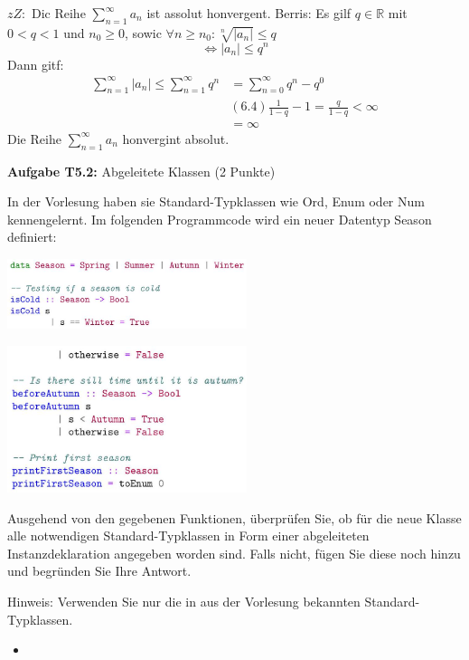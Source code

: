 $z Z:$ Dic Reihe $\sum_{n=1}^{\infty} a_n$ ist assolut honvergent.
Berris:
Es gilf $q \in \mathbb{R}$ mit $0<q<1$ und $n_0 \geq 0$, sowic $\forall n \geq n_0: \sqrt[n]{\left|a_n\right|} \leq q$
$$
\Leftrightarrow\left|a_n\right| \leq q^n
$$
Dann gitf:
$$
\begin{aligned}
\sum_{n=1}^{\infty}\left|a_n\right| \leq \sum_{n=1}^{\infty} q^n &=\sum_{n=0}^{\infty} q^n-q^0 \\
&(6.4) \frac{1}{1-q}-1=\frac{q}{1-q}<\infty \\
&=\infty
\end{aligned}
$$
Die Reihe $\sum_{n=1}^{\infty} a_n$ honvergint absolut.

\newpage

\textbf{Aufgabe T5.2:} Abgeleitete Klassen (2 Punkte)

In der Vorlesung haben sie Standard-Typklassen wie Ord, Enum oder Num kennengelernt. Im folgenden Programmcode wird ein neuer 
Datentyp Season definiert:

\includegraphics[width=7cm]{2022_11_15_0a5a2eee0aef383b0ce9g-1(1)}

\includegraphics[width=7cm]{2022_11_15_0a5a2eee0aef383b0ce9g-2}

Ausgehend von den gegebenen Funktionen, überprüfen Sie, ob für die neue Klasse alle notwendigen Standard-Typklassen in Form 
einer abgeleiteten Instanzdeklaration angegeben worden sind. Falls nicht, fügen Sie diese noch hinzu und begründen Sie Ihre Antwort.

Hinweis: Verwenden Sie nur die in aus der Vorlesung bekannten Standard-Typklassen.

\newpage

\begin{itemize}
  \item []\inputminted{Haskell}{A5_2.hs}
\end{itemize}


